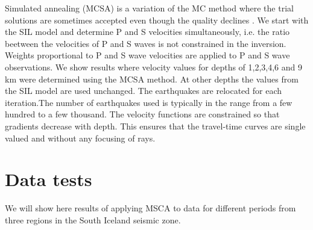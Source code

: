 \documentclass[extra]{gji}
\begin{document}
Simulated annealing (MCSA) is a variation of the MC
method where the trial solutions are sometimes accepted even though
the quality declines \citep{menke13}.
We start with the SIL model and determine P and S velocities
simultaneously, i.e. the ratio beetween the velocities of P and S waves
is not constrained in the inversion. Weights proportional to P and S
wave velocities are applied to P and S wave observations. We show
results where velocity values for depths of 1,2,3,4,6 and 9 km were
determined using the MCSA method. At other depths the values from
the SIL model are used unchanged. The earthquakes are relocated for
each iteration.The number of earthquakes used is typically in the
range from a few hundred to a few thousand. The velocity functions
are constrained so that gradients decrease with depth. This ensures
that the travel-time curves are single valued and without any focusing
of rays.

\section{Data tests}
We will show here results of applying MSCA to data for different periods 
from three regions in the South Iceland seismic zone.




\bsp %

\label{lastpage}
\end{document}
